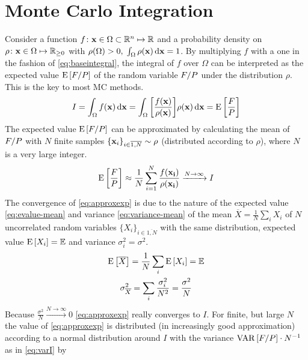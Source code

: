 \section{Monte Carlo Integration}%
\label{sec:mcint}

Consider a function
\(f\colon \vb{x}\in\Omega\subset\mathbb{R}^n\mapsto\mathbb{R}\) and a
probability density on
\(\rho\colon \vb{x}\in\Omega\mapsto\mathbb{R}_{\geq 0}\) with
\(\rho(\Omega) > 0,\; \int_{\Omega}\rho(\vb{x})\dd{\vb{x}} = 1\).  By
multiplying \(f\) with a one in the fashion of \cref{eq:baseintegral},
the integral of \(f\) over \(\Omega\) can be interpreted as the
expected value \(\operatorname{E}\qty[F/P]\) of the random variable \(F/P\) under
the distribution \(\rho\). This is the key to most MC methods.
%
\begin{equation}
  \label{eq:baseintegral}
  I = \int_\Omega f(\vb{x}) \dd{\vb{x}} = \int_\Omega
  \qty[\frac{f(\vb{x})}{\rho(\vb{x})}] \rho(\vb{x}) \dd{\vb{x}} = \operatorname{E}\qty[\frac{F}{P}]
\end{equation}
%
The expected value \(\operatorname{E}\qty[F/P]\) can be approximated by calculating
the mean of \(F/P\) with \(N\) finite samples
\(\{\vb{x}_i\}_{i\in\overline{1,N}}\sim\rho\) (distributed according
to \(\rho\)), where \(N\) is a very large integer.
%
\begin{equation}
  \label{eq:approxexp}
  \operatorname{E}\qty[\frac{F}{P}] \approx
  \frac{1}{N}\sum_{i=1}^N\frac{f(\vb{x_i})}{\rho(\vb{x_i})}
  \xrightarrow{N\rightarrow\infty} I
\end{equation}
%
The convergence of \cref{eq:approxexp} is due to the nature of the
expected value \cref{eq:evalue-mean} and
variance \cref{eq:variance-mean} of the mean
\(\overline{X} = \frac{1}{N}\sum_i X_i\) of \(N\) uncorrelated random
variables \(\{X_i\}_{i\in\overline{1,N}}\) with the same distribution,
expected value \(\operatorname{E}\qty[X_i]=\mathbb{E}\) and variance
\(\sigma_i^2 = \sigma^2\).
%
\begin{gather}
  \operatorname{E}\qty[\overline{X}] = \frac{1}{N}\sum_i\operatorname{E}\qty[X_i] = \mathbb{E} \label{eq:evalue-mean}\\
  \sigma^2_{\overline{X}} = \sum_i\frac{\sigma_i^2}{N^2} =
                            \frac{\sigma^2}{N}  \label{eq:variance-mean}
\end{gather}
%
Because \(\frac{\sigma^2}{N}\xrightarrow{N\rightarrow\infty} 0\)
\cref{eq:approxexp} really converges to \(I\). For finite, but large
\(N\) the value of \cref{eq:approxexp} is distributed (in increasingly
good approximation) according to a normal distribution around \(I\)
with the variance \(\operatorname{VAR}\qty[F/P]\cdot N^{-1}\) as in \cref{eq:varI} by
